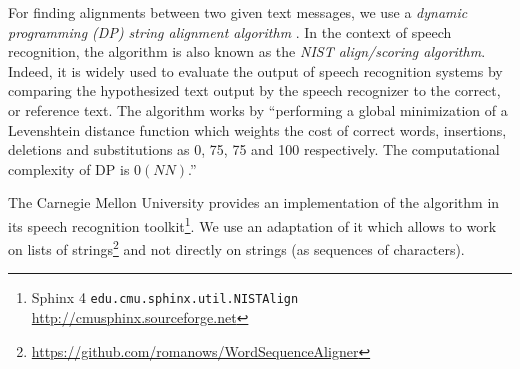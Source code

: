 For finding alignments between two given text messages, we use 
a \textit{dynamic programming (DP) string alignment algorithm} \cite{sankoff:1983}. 
In the context of speech recognition, the algorithm is also known as the \textit{NIST align/scoring algorithm}. Indeed, it is widely used to evaluate the output of speech recognition systems by comparing the hypothesized text %
output by the speech recognizer to the correct, or reference %
text. 
%
The %
algorithm works by ``performing a global minimization of a Levenshtein distance function which weights the cost of correct words, insertions, deletions and substitutions as 0, 75, 75 and 100 respectively.
%
The computational complexity of DP is $0(NN)$.''






The Carnegie Mellon University provides an implementation of the algorithm in its speech recognition toolkit\footnote{Sphinx 4 \texttt{edu.cmu.sphinx.util.NISTAlign} %
\url{http://cmusphinx.sourceforge.net}}.
We use an adaptation of it which allows to work on lists of strings\footnote{\url{https://github.com/romanows/WordSequenceAligner}} and not directly on strings (as sequences of characters).


